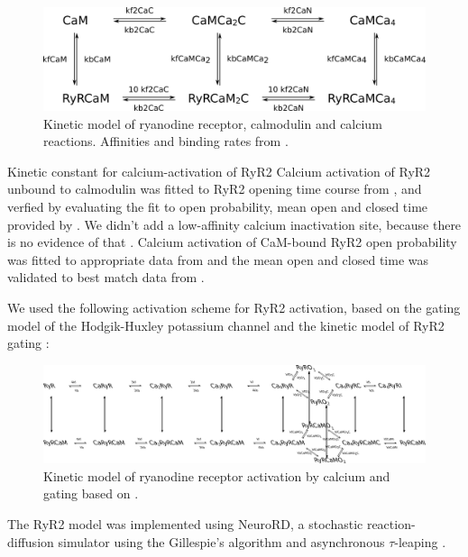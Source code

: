 \documentclass[9pt,lineno]{elife}
\begin{document}
\begin{figure}
\includegraphics[width=0.95\linewidth]{ryrcamca_binding_scheme.png}
\caption{Kinetic model of ryanodine receptor, calmodulin and calcium reactions. Affinities and binding rates from \citep{BALSHAW200120144, ryrcam_sites_affinities, ryrcam_dissociation_rate, 3_sites_ryr3cam, doi:10.1021/bi700655h, Fret_CaM_to_RyR2}. \label{fig:RyR2CaM}}
\end{figure}

Kinetic constant for calcium-activation of RyR2 Calcium activation of RyR2 unbound to calmodulin was fitted to RyR2 opening time course from \citep{ca_stoichiometry_ryr}, and verfied by evaluating the fit to open probability, mean open and closed time provided by \citep{xu_meissner_2004}. We didn't add a low-affinity calcium inactivation site, because there is no evidence of that \citep{https://doi.org/10.1111/j.1469-7793.1999.00575.x}. Calcium activation of CaM-bound RyR2 open probability was fitted to appropriate data from \citep{xu_meissner_2004} and the mean open and closed time was validated to best match data from \citep{xu_meissner_2004}.

We used the following activation scheme for RyR2 activation, based on the gating model of the Hodgik-Huxley potassium channel \citep{johnston_wu} and the kinetic model of RyR2 gating \citep{Zahradnikova_kon,ca_stoichiometry_ryr}:
\begin{figure}
\includegraphics[width=0.95\linewidth]{RyR_Ca_activation_scheme.png}
\caption{Kinetic model of ryanodine receptor activation by calcium and gating based on \citep{johnston_wu,Zahradnikova_kon,ca_stoichiometry_ryr}. \label{fig:RyR2activation}}
\end{figure}




The RyR2 model was implemented using NeuroRD, a stochastic reaction-diffusion simulator using the Gillespie's algorithm and asynchronous $\tau$-leaping \citep{neurord_tau_leaping}.
\end{document}
